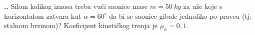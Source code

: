 

\noindent 
\textbf{
\thecjelina.\thezadatak.}
Silom kolikog iznosa treba vući saonice mase $m=50\ kg$ za uže koje s horizontalom zatvara kut $\alpha=60^\circ$  da bi se saonice gibale jednoliko po pravcu (tj. stalnom brzinom)? Koeficijent kinetičkog trenja je $\mu_k=0,1$.

